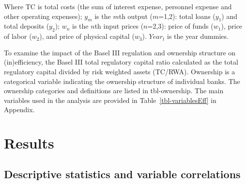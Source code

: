 \documentclass[
  12pt,
  a4paper,
]{scrreprt}
\begin{document}
Where TC is total costs (the sum of interest expense, personnel expense
and other operating expenses); \(y_{m}\) is the \(m\)th output
(\(m\)=1,2): total loans (\(y_{1}\)) and total deposits (\(y_{2}\));
\(w_{n}\) is the \(n\)th input prices (\(n\)=2,3): price of funds
(\(w_{1}\)), price of labor (\(w_{2}\)), and price of physical capital
(\(w_{3}\)). \(Year_{t}\) is the year dummies.

To examine the impact of the Basel III regulation and ownership
structure on (in)efficiency, the Basel III total regulatory capital
ratio calculated as the total regulatory capital divided by risk
weighted assets (TC/RWA). Ownership is a categorical variable indicating
the ownership structure of individual banks. The ownership categories
and definitions are listed in tbl-ownership. The main variables used in
the analysis are provided in Table~\ref{tbl-variablesEff} in Appendix.

\section{Results}\label{results}

\subsection{Descriptive statistics and variable
correlations}\label{descriptive-statistics-and-variable-correlations}
\end{document}
